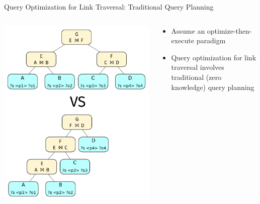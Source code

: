 \begin{frame}{Query Optimization for Link Traversal: Traditional Query Planning}
    \begin{columns}[T] %
        \begin{column}{0.6\textwidth} %
            \includegraphics[width=.75\linewidth]{images/query-planning.pdf} %
        \end{column}

        \begin{column}{0.4\textwidth}
            \begin{itemize}
                \item Assume an optimize-then-execute paradigm
                \item Query optimization for link traversal involves traditional (zero knowledge) query planning
            \end{itemize}
        \end{column}
    \end{columns}
\end{frame}

